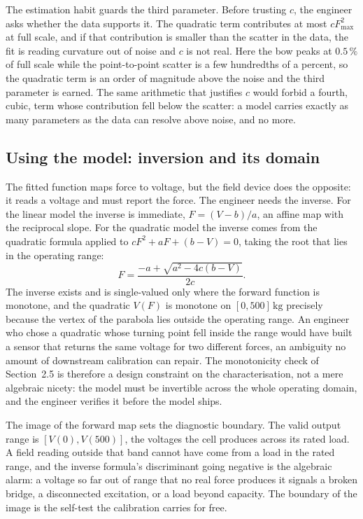 The estimation habit guards the third parameter. Before trusting $c$,
the engineer asks whether the data supports it. The quadratic term
contributes at most $c F^{2}_{\max}$ at full scale, and if that
contribution is smaller than the scatter in the data, the fit is
reading curvature out of noise and $c$ is not real. Here the bow
peaks at $0.5\,\%$ of full scale while the point-to-point scatter is
a few hundredths of a percent, so the quadratic term is an order of
magnitude above the noise and the third parameter is earned. The same
arithmetic that justifies $c$ would forbid a fourth, cubic, term
whose contribution fell below the scatter: a model carries exactly as
many parameters as the data can resolve above noise, and no more.

\subsection{Using the model: inversion and its domain}

The fitted function maps force to voltage, but the field device does
the opposite: it reads a voltage and must report the force. The
engineer needs the inverse. For the linear model the inverse is
immediate, $F = (V - b)/a$, an affine map with the reciprocal slope.
For the quadratic model the inverse comes from the quadratic formula
applied to $c F^{2} + a F + (b - V) = 0$, taking the root that lies
in the operating range:
\[
  F = \frac{-a + \sqrt{a^{2} - 4c(b - V)}}{2c}.
\]
The inverse exists and is single-valued only where the forward
function is monotone, and the quadratic $V(F)$ is monotone on
$[0, 500]\,\si{\kilogram}$ precisely because the vertex of the
parabola lies outside the operating range. An engineer who chose a
quadratic whose turning point fell inside the range would have built
a sensor that returns the same voltage for two different forces, an
ambiguity no amount of downstream calibration can repair. The
monotonicity check of Section~2.5 is therefore a design constraint on
the characterisation, not a mere algebraic nicety: the model must be
invertible across the whole operating domain, and the engineer
verifies it before the model ships.

The image of the forward map sets the diagnostic boundary. The valid
output range is $[V(0), V(500)]$, the voltages the cell produces
across its rated load. A field reading outside that band cannot have
come from a load in the rated range, and the inverse formula's
discriminant going negative is the algebraic alarm: a voltage so far
out of range that no real force produces it signals a broken bridge,
a disconnected excitation, or a load beyond capacity. The boundary of
the image is the self-test the calibration carries for free.


